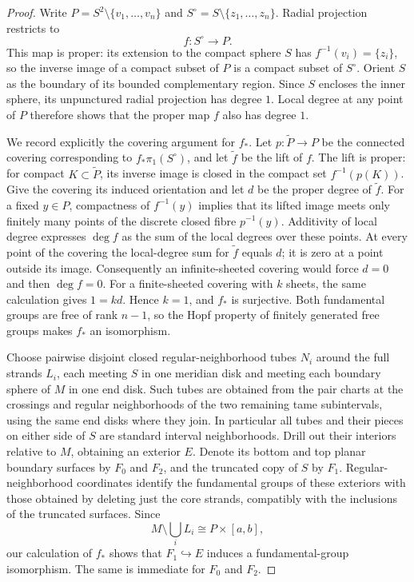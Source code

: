 \documentclass[11pt]{article}
\numberwithin{equation}{section}
\theoremstyle{definition}
\theoremstyle{remark}
\begin{document}
\begin{proof}
Write $P=S^2\setminus\{v_1,\ldots,v_n\}$ and
$S^\circ=S\setminus\{z_1,\ldots,z_n\}$.  Radial projection restricts to
\[
 f:S^\circ\longrightarrow P.
\]
This map is proper: its extension to the compact sphere $S$ has
$f^{-1}(v_i)=\{z_i\}$, so the inverse image of a compact subset of $P$
is a compact subset of $S^\circ$.  Orient $S$ as the boundary of its
bounded complementary region.  Since $S$ encloses the inner sphere,
its unpunctured radial projection has degree $1$.  Local degree at any
point of $P$ therefore shows that the proper map $f$ also has degree $1$.

We record explicitly the covering argument for $f_*$.  Let
$p:\widetilde P\to P$ be the connected covering corresponding to
$f_*\pi_1(S^\circ)$, and let $\widetilde f$ be the lift of $f$.
The lift is proper: for compact $K\subset\widetilde P$, its inverse
image is closed in the compact set $f^{-1}(p(K))$.
Give the covering its induced orientation and let $d$ be the proper
degree of $\widetilde f$.  For a fixed $y\in P$, compactness of
$f^{-1}(y)$ implies that its lifted image meets only finitely many
points of the discrete closed fibre $p^{-1}(y)$.  Additivity of local
degree expresses $\deg f$ as the sum of the local degrees over these
points.  At every point of the covering the local-degree sum for
$\widetilde f$ equals $d$; it is zero at a point outside its image.
Consequently an infinite-sheeted covering would force $d=0$ and then
$\deg f=0$.  For a finite-sheeted covering with $k$ sheets, the same
calculation gives $1=k d$.  Hence $k=1$, and $f_*$ is surjective.
Both fundamental groups are free of rank $n-1$, so the Hopf property
of finitely generated free groups \cite[III.A, Complements~18--19]{deLaHarpe2000} makes $f_*$ an isomorphism.

Choose pairwise disjoint closed regular-neighborhood tubes $N_i$
around the full strands $L_i$, each meeting $S$ in one meridian disk
and meeting each boundary sphere of $M$ in one end disk.  Such tubes
are obtained from the pair charts at the crossings and regular
neighborhoods of the two remaining tame subintervals, using the same
end disks where they join.  In particular all tubes and their pieces
on either side of $S$ are standard interval neighborhoods.
Drill out their interiors relative to $M$, obtaining an exterior $E$.
Denote its bottom and top planar boundary surfaces by $F_0$ and $F_2$,
and the truncated copy of $S$ by $F_1$.
Regular-neighborhood coordinates identify the fundamental groups of
these exteriors with those obtained by deleting just the core
strands, compatibly with the inclusions of the truncated surfaces.
Since
\[
 M\setminus\bigcup_iL_i\cong P\times[a,b],
\]
our calculation of $f_*$ shows that $F_1\hookrightarrow E$ induces a
fundamental-group isomorphism.  The same is immediate for $F_0$ and
$F_2$.


\end{proof}
\end{document}
